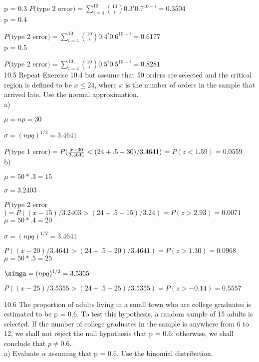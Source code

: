 p = 0.3
$P($type 2 error$)$$= \sum^{10}_{i = 4} $${10} \choose {i}$$ 0.3^i 0.7 ^{10-i}$$=0.3504$ \\

p = 0.4 

$P($type 2 error$)$$= \sum^{10}_{i = 4} $${10} \choose {i}$$ 0.4^i 0.6 ^{10-i}$$=0.6177$ \\

p = 0.5

$P($type 2 error$)$$= \sum^{10}_{i = 4} $${10} \choose {i}$$ 0.5^i 0.5 ^{10-i}$$=0.8281$ \\


10.5 Repeat Exercise 10.4 but assume that 50 orders are selected and the critical region is defined to be $x \leq 24$, where $x$ is the number of orders in the sample that arrived late. Use the normal approximation. \\

a)

$\mu = np = 30$

$\sigma = (npq)^{1/2} = 3.4641$

$P($type 1 error$)= P(\frac{x- 30}{3.4641} < (24+.5-30)/3.4641)$$=P(z < 1.59) = 0.0559$ \\

b)

$\mu = 50 * .3 = 15$

$\sigma = 3.2403$

$P($type 2 error$) = P((x-15)/3.2403 > (24+.5-15)/3.24) = P(z > 2.93) = 0.0071$ \\

$\mu = 50 * .4 = 20$

$\sigma = (npq)^{1/2} = 3.4641$

$P((x-20)/3.4641 > (24 + .5 - 20)/3.4641) = P(z > 1.30) = 0.0968$ \\

$\mu = 50 * .5 = 25$

$\simga = (npq)^{1/2} = 3.5355$

$P((x-25)/3.5355 > (24 + .5 - 25)/3.5355)$$ = P(z > -0.14) = 0.5557$

10.6 The proportion of adults living in a small town who are college graduates is estimated to be p = 0.6. To test this hypothesis, a random sample of 15 adults is selected. If the number of college graduates in the sample is anywhere from 6 to 12, we shall not reject the null hypothesis that p = 0.6; otherwise, we shall conclude that $p \neq 0.6$. \\

a) Evaluate $\alpha$ assuming that p = 0.6. Use the binomial distribution. \\


